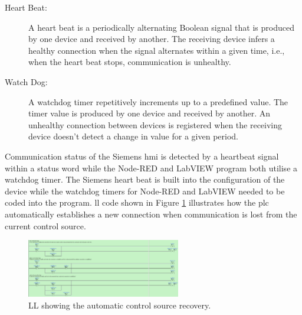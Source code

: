         \begin{description}
        
            \item[Heart Beat:] A heart beat is a periodically alternating Boolean signal that is produced by one device and received by another. The receiving device infers a healthy connection when the signal alternates within a given time, i.e., when the heart beat stops, communication is unhealthy. 
            
            \item[Watch Dog:] A watchdog timer repetitively increments up to a predefined value. The timer value is produced by one device and received by another. An unhealthy connection between devices is registered when the receiving device doesn't detect a change in value for a given period.
            
        \end{description}

        Communication status of the Siemens \acrshort{hmi} is detected by a heartbeat signal within a status word while the Node-RED and LabVIEW program both utilise a watchdog timer. The Siemens heart beat is built into the configuration of the device while the watchdog timers for Node-RED and LabVIEW needed to be coded into the program.
        \acrshort{ll} code shown in Figure \ref{fig:autoControlSourceRecovery} illustrates how the \acrshort{plc} automatically establishes a new connection when communication is lost from the current control source.  

        \begin{figure}[H]
            \centering
            \includegraphics[width = 0.6\textwidth]{2_images/autoControlSourceRecovery}
            \caption{LL showing the automatic control source recovery.}
            \label{fig:autoControlSourceRecovery}
        \end{figure}        

